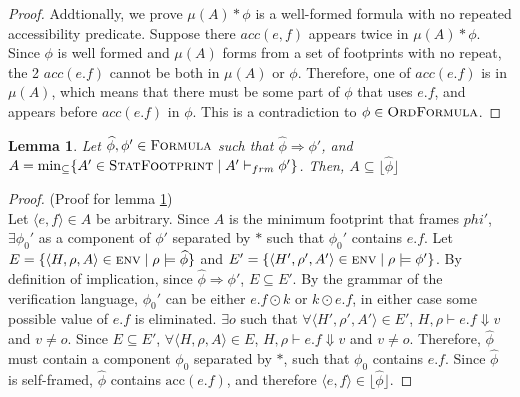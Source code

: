 \documentclass {article}
\newtheorem{lemma}[theorem]{Lemma}
\newcommand{\fphi}{\widehat{\phi}}
\newcommand{\acc}[1]{\text{acc}(#1)}
\newcommand{\imp}{\Rightarrow}
\newcommand{\consistent}{\models}
\newcommand{\frm}{\vdash_{frm}}
\newcommand{\formula}{\textsc{Formula}}
\newcommand{\statfprint}{\textsc{StatFootprint}}
\begin{document}
\begin{proof}
Addtionally, we prove $\mu(A) \ast \phi$ is a well-formed formula with no repeated accessibility predicate. Suppose there $acc(e,f)$ appears twice in $\mu(A) \ast \phi$. Since $\phi$ is well formed and $\mu(A)$ forms from a set of footprints with no repeat, the 2 $acc(e.f)$ cannot be both in $\mu(A)$ or $\phi$. Therefore, one of $acc(e.f)$ is in $\mu(A)$, which means that there must be some part of $\phi$ that uses $e.f$, and appears before $acc(e.f)$ in $\phi$. This is a contradiction to $\phi \in \textsc{OrdFormula}$.
\end{proof}

 \begin{lemma}
 \label{lemma_frm_imp}
 Let $\fphi, \phi' \in \formula$ such that $\fphi \imp \phi'$, and $A = \min_{\subseteq}\{A' \in \statfprint \mid A' \frm \phi'\}$. Then, $A \subseteq \lfloor \fphi \rfloor$
\end{lemma}
\begin{proof} (Proof for lemma \ref{lemma_frm_imp})\\
    Let $\langle e,f\rangle  \in A$ be arbitrary. Since $A$ is the minimum footprint that frames $phi'$, $\exists \phi_0'$ as a component of $\phi'$ separated by $\ast$ such that $\phi_0'$ contains $e.f$. Let $E = \{\langle H, \rho, A\rangle  \in \textsc{env} \mid \rho \consistent \fphi\}$ and $E' = \{\langle H', \rho', A'\rangle  \in \textsc{env} \mid \rho \consistent \phi'\}$. By definition of implication, since $\fphi \imp \phi'$, $E \subseteq E'$. By the grammar of the verification language, $\phi_0'$ can be either $e.f \odot k$ or $k \odot e.f$, in either case some possible value of $e.f$ is eliminated. $\exists o$ such that $\forall \langle H', \rho', A'\rangle  \in E'$, $H, \rho \vdash e.f \Downarrow v$ and $v \neq o$. Since $E \subseteq E'$, $\forall \langle H, \rho, A\rangle  \in E$, $H, \rho \vdash e.f \Downarrow v$ and $v \neq o$. Therefore, $\fphi$ must contain a component $\phi_0$ separated by $\ast$, such that $\phi_0$ contains $e.f$. Since $\fphi$ is self-framed, $\fphi$ contains $\acc{e.f}$, and therefore $\langle e,f\rangle  \in \lfloor \fphi \rfloor$.
    
\end{proof}
\end{document}
